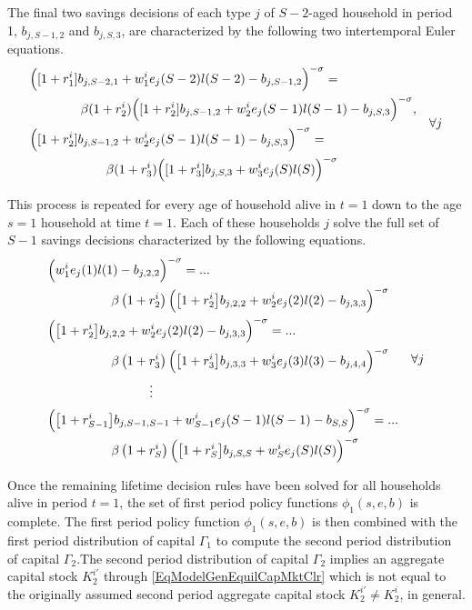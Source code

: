 \documentclass[letterpaper,12pt]{article}
\theoremstyle{definition}
\begin{document}
  The final two savings decisions of each type $j$ of $S-2$-aged household in period 1, $b_{j,S-1,2}$ and $b_{j,S,3}$, are characterized by the following two intertemporal Euler equations.
  \begin{equation}\label{EqEulerSm2p1}
    \begin{split}
      &\Bigl([1+r_1^i]b_{j,S-2,1} + w_1^i e_j(S-2)l(S-2) - b_{j,S-1,2}\Bigr)^{-\sigma} = \\
      &\quad\quad\quad\quad \beta(1+r_2^i)\Bigl([1+r_2^i]b_{j,S-1,2} + w_2^i e_j(S-1)l(S-1) - b_{j,S,3}\Bigr)^{-\sigma}, \\
      &\Bigl([1+r_2^i]b_{j,S-1,2} + w_2^i e_j(S-1)l(S-1) - b_{j,S,3}\Bigr)^{-\sigma} = \\
      &\quad\quad\quad\quad\quad\quad \beta(1+r_3^i)\Bigl([1+r_3^i]b_{j,S,3} + w_3^i e_j(S)l(S)\Bigr)^{-\sigma}
    \end{split} \quad\forall j
  \end{equation}

  This process is repeated for every age of household alive in $t=1$ down to the age $s=1$ household at time $t=1$. Each of these households $j$ solve the full set of $S-1$ savings decisions characterized by the following equations.
  \begin{equation}\label{EqEulerFullp1}
    \begin{split}
      &\Bigl(w_1^i e_j(1)l(1) - b_{j,2,2}\Bigr)^{-\sigma} = ... \\
      &\quad\quad\quad\quad\quad \beta\left(1+r_2^i\right)\Bigl(\bigl[1+r_2^i\bigr]b_{j,2,2} + w_2^i e_j(2)l(2) - b_{j,3,3}\Bigr)^{-\sigma} \\
      &\Bigl(\bigl[1+r_2^i\bigr]b_{j,2,2} + w_2^i e_j(2)l(2) - b_{j,3,3}\Bigr)^{-\sigma} = ... \\
      &\quad\quad\quad\quad\quad \beta\left(1 + r_3^i\right)\Bigl(\bigl[1+r_3^i\bigr]b_{j,3,3} + w_3^i e_j(3)l(3) - b_{j,4,4}\Bigr)^{-\sigma} \\
      &\quad\quad\quad\quad\quad\quad\quad\quad\vdots \\
      &\Bigl(\bigl[1 + r_{S-1}^i\bigr]b_{j,S-1,S-1} + w_{S-1}^i e_j(S-1)l(S-1) - b_{S,S}\Bigr)^{-\sigma} = ... \\
      &\quad\quad\quad\quad\quad \beta\left(1 + r_S^i\right)\Bigl(\bigl[1+r_S^i\bigr]b_{j,S,S} + w_S^i e_j(S)l(S)\Bigr)^{-\sigma}
    \end{split}\quad\forall j
  \end{equation}

  Once the remaining lifetime decision rules have been solved for all households alive in period $t=1$, the set of first period policy functions $\phi_1(s,e,b)$ is complete. The first period policy function $\phi_1(s,e,b)$ is then combined with the first period distribution of capital $\Gamma_1$ to compute the second period distribution of capital $\Gamma_2$.The second period distribution of capital $\Gamma_2$ implies an aggregate capital stock $K_2^{i'}$ through \eqref{EqModelGenEquilCapMktClr} which is not equal to the originally assumed second period aggregate capital stock $K_2^{i'}\neq K_2^i$, in general.
\end{document}
